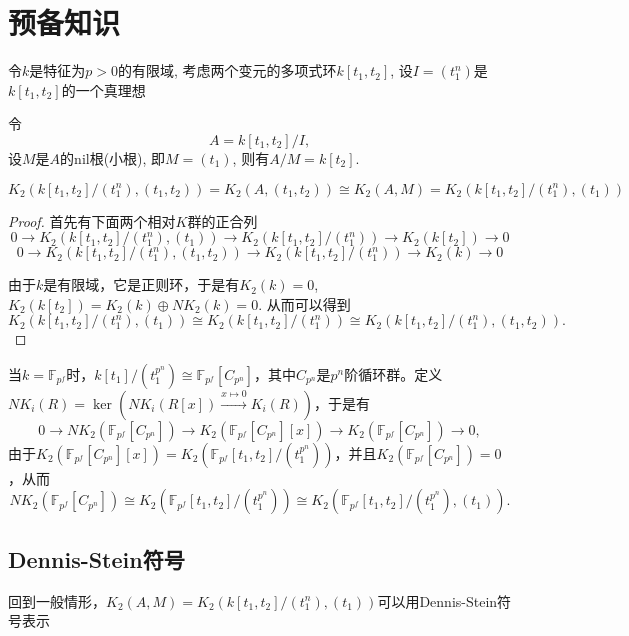 \section{预备知识}
令$k$是特征为$p>0$的有限域, 考虑两个变元的多项式环$k[t_1, t_2]$, 设$I=(t_1^n)$是$k[t_1, t_2]$的一个真理想

令
\[A=k[t_1,t_2]/I,\]
设$M$是$A$的nil根(小根), 即$M=(t_1)$, 则有$A/M=k[t_2]$. 
\begin{prop}
	$K_2(k[t_1,t_2]/(t_1^n),(t_1,t_2))=K_2(A,(t_1,t_2))\cong K_2(A,M)=K_2(k[t_1,t_2]/(t_1^n),(t_1))$
\end{prop}
\begin{proof}
	首先有下面两个相对$K$群的正合列
	\[
	0\longrightarrow K_2(k[t_1,t_2]/(t_1^n),(t_1)) \longrightarrow K_2(k[t_1,t_2]/(t_1^n)) \longrightarrow K_2(k[t_2]) \longrightarrow 0
	\]
	\[
	0\longrightarrow K_2(k[t_1,t_2]/(t_1^n),(t_1,t_2)) \longrightarrow K_2(k[t_1,t_2]/(t_1^n)) \longrightarrow K_2(k) \longrightarrow 0
	\]

	由于$k$是有限域，它是正则环，于是有$K_2(k)=0$, $K_2(k[t_2])=K_2(k)\oplus NK_2(k)=0$. 从而可以得到
	\[K_2(k[t_1,t_2]/(t_1^n),(t_1))\cong K_2(k[t_1,t_2]/(t_1^n)) \cong K_2(k[t_1,t_2]/(t_1^n),(t_1,t_2)).\]
\end{proof}

当$k=\mathbb{F}_{p^f}$时，$k[t_1]/(t_1^{p^n})\cong \mathbb{F}_{p^f}[C_{p^n}]$，其中$C_{p^n}$是$p^n$阶循环群。定义$NK_i(R)=\ker(NK_i(R[x])\overset{x\mapsto 0}\longrightarrow K_i(R))$，于是有
\[0\longrightarrow NK_2(\mathbb{F}_{p^f}[C_{p^n}]) \longrightarrow K_2(\mathbb{F}_{p^f}[C_{p^n}][x])\longrightarrow K_2(\mathbb{F}_{p^f}[C_{p^n}]) \longrightarrow 0,\]
由于$K_2(\mathbb{F}_{p^f}[C_{p^n}][x])=K_2(\mathbb{F}_{p^f}[t_1,t_2]/(t_1^{p^n}))$，并且$K_2(\mathbb{F}_{p^f}[C_{p^n}])=0$，从而
\[NK_2(\mathbb{F}_{p^f}[C_{p^n}])\cong K_2(\mathbb{F}_{p^f}[t_1,t_2]/(t_1^{p^n})) \cong K_2(\mathbb{F}_{p^f}[t_1,t_2]/(t_1^{p^n}),(t_1)).\]


\subsection{Dennis-Stein符号}
\label{sub:dennis_stein_symbols}
回到一般情形，$K_2(A,M)=K_2(k[t_1,t_2]/(t_1^n),(t_1))$可以用Dennis-Stein符号表示

